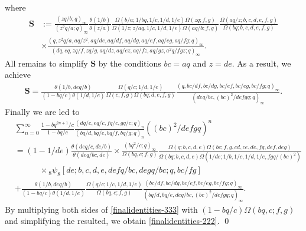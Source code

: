 \documentclass[xits,review,sort&compress]{elsarticle}
\numberwithin{equation}{section}
\newcommand{\poq}[2]{(#1;q)_{#2}}
\begin{document}
 where
 \begin{align*}
 \mathbf{S}&:=\frac{(zq/b;q)_{\infty}}{(z^2q/a;q)_{\infty}}\frac{\theta(1/b)}{\theta(z/a)}
 \frac{\Omega(b/a;1/bq,1/c,1/d,1/e)
 \Omega(zq;f,g)}{\Omega(1/z;z/aq,1/c,1/d,1/e)\Omega(aq/b;f,g)}
\frac{\Omega(aq/z;b,c,d,e,f,g)}{\Omega(bq;b,c,d,e,f,g)}\\
&\times \frac{\poq{q,z^2q/a,aq/z^2,aq/d
 e,aq/d f,aq/d g,aq/e f,aq/e g,aq/f g}{\infty}}{\poq{dq,eq,zq/f,zq/g,aq/dz,aq/ez,aq/fz,aq/g z,a^2 q/f gz}{\infty}}.
\end{align*}
All remains to simplify $\mathbf{S}$  by the  conditions $bc=aq$ and $z=de$.  As a result, we achieve
\begin{align*}
 \mathbf{S}=\frac{\theta(1/b,deq/b)}{(1-bq/c)\theta(1/d,1/e)} \frac{\Omega(q/c;1/d,1/e)
 }{\Omega(c;f,g)\Omega(bq;d,e,f,g)}\frac{\poq{q,bc/d f,bc/d g,bc/e f,bc/e g,bc/f g}{\infty}}{\poq{deq/bc,(bc)^2/defgq}{\infty}}.\nonumber
\end{align*}
Finally we are led to
\begin{align}
 &\sum_{n=0}^\infty\frac{1-bq^{2n+1}/c}{1-bq/c}\frac{\poq{dq/c, eq /c, fq /c, gq /c }{n}}{\poq{bq/d, bq /e, bq /f, bq /g }{n}}((bc)^{2}/ defgq)^n\nonumber\\
 &=(1-1/de)
\frac{\theta(deq/c,de/b)}{\theta(deq/bc,de)}\times\frac{(bq^2/c; q)_{\infty}}{\Omega(bq,c;f,g)}\frac{\Omega(q;b,c,d,e)\Omega(bc;f,g,cd,ce,de,fg, def,deg)}{\Omega( bq;b,c,d,e)\Omega(1/de;1/b,1/c,1/d,
 1/e,fgq/(bc)^{2})}\nonumber\\
 &\qquad\quad\times {}_{8} \psi_{8}[de; b, c, d, e, defq/bc, degq/bc ; q, bc/ f g]\label{finalidentities-333}\\
 &+\frac{\theta(1/b,deq/b)}{(1-bq/c)\theta(1/d,1/e)} \frac{\Omega(q/c;1/c,1/d,1/e)
 }{\Omega(bq,c;f,g)}\frac{\poq{bc/d f,bc/d g,bc/e f,bc/e g,bc/f g}{\infty}}{\poq{bq/d,bq/e,deq/bc,(bc)^2/defgq}{\infty}}.\nonumber
 \end{align}
By multiplying both sides of \eqref{finalidentities-333} with $(1-bq/c)\Omega(bq,c;f,g)$ and simplifying the resulted, we obtain  \eqref{finalidentities-222}.
\qed
\end{document}
